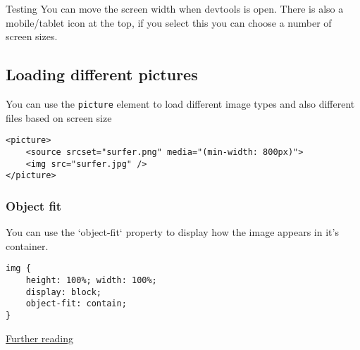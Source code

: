 \begin{infobox}{Testing}
    You can move the screen width when devtools is open. There is also a mobile/tablet icon at the top, if you select this you can choose a number of screen sizes.
\end{infobox}

\subsection{Loading different pictures}

You can use the \texttt{picture} element to load different image types and also different files based on screen size

\begin{verbatim}
<picture>
	<source srcset="surfer.png" media="(min-width: 800px)">
	<img src="surfer.jpg" />
</picture>
\end{verbatim}


\subsubsection{Object fit}

You can use the `object-fit` property to display how the image appears in it's container.

\begin{verbatim}
img {
	height: 100%; width: 100%;
	display: block;
	object-fit: contain;
}
\end{verbatim}

\href{https://developer.mozilla.org/en-US/docs/Web/HTML/Element/picture}{Further reading}